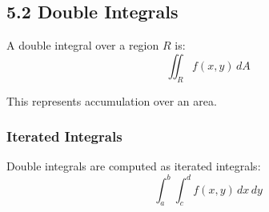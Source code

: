 \subsection*{5.2 Double Integrals}
\begin{conceptbox}
    A double integral over a region $R$ is:
    \begin{equation*}
        \iint_R f(x,y)\, dA
    \end{equation*}
\end{conceptbox}

This represents accumulation over an area.
\subsubsection*{Iterated Integrals}

Double integrals are computed as iterated integrals:
\begin{equation*}
    \int_a^b \int_c^d f(x,y)\, dx\, dy
\end{equation*}

